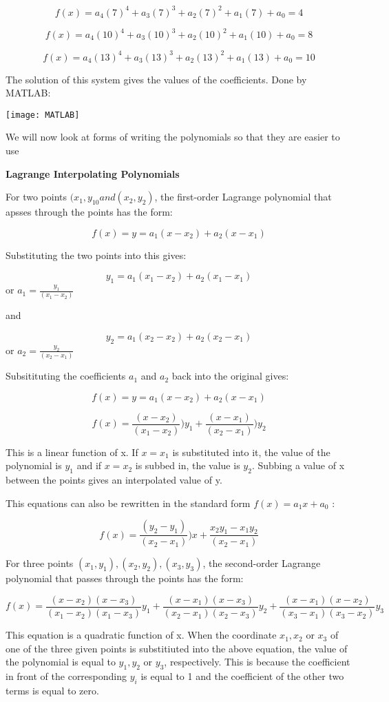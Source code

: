 \documentclass{article}
\begin{document}
\[f(x) = a_4(7)^4 + a_{3}(7)^{3} + a_2(7)^2 + a_1(7) + a_0 = 4\]

\[f(x) = a_4(10)^4 + a_{3}(10)^{3} + a_2(10)^2 + a_1(10) + a_0 = 8\]

\[f(x) = a_4(13)^4 + a_{3}(13)^{3} + a_2(13)^2 + a_1(13) + a_0 = 10\]

The solution of this system gives the values of the coefficients. Done by MATLAB:

\texttt{[image: MATLAB]}

We will now look at forms of writing the polynomials so that they are easier to use


\textbf{Lagrange Interpolating Polynomials}

For two points $(x_1, y_10 and (x_2, y_2)$, the first-order Lagrange polynomial that apsses through the points has the form:

\[f(x) = y = a_1(x - x_2) + a_2(x - x_1)\]

Substituting the two points into this gives:

\[y_1 = a_1(x_1 - x_2) + a_2(x_1 - x_1)\]   or $a_1 = \frac{y_1}{(x_1 - x_2)}$

and

\[y_2 = a_1(x_2 - x_2) + a_2(x_2 - x_1)\]    or $a_2 = \frac{y_2}{(x_2 - x_1)}$

Subsitituting the coefficients $a_1$ and $a_2$ back into the original gives:

\[f(x) = y = a_1(x - x_2) + a_2(x - x_1)\]

\[f(x) =\frac{(x - x_2)}{(x_1 - x_2)})y_1 + \frac{(x - x_1)}{(x_2 - x_1)})y_2\]

This is a linear function of x. If $x =  x_1$ is substituted into it, the value of the polynomial is $y_1$ and if $x = x_2$ is subbed in, the value is $y_2$. Subbing a value of x between the points gives an interpolated value of y.

This equations can also be rewritten in the standard form $f(x) = a_1x + a_0$ :

\[f(x) =\frac{(y_2 - y_1)}{(x_2 - x_1)})x + \frac{x_2y_1 - x_1y_2}{(x_2 - x_1)}\]


For three points $(x_1, y_1), (x_2, y_2), (x_3, y_3)$, the second-order Lagrange polynomial that passes through the points has the form:

\[f(x) = \frac{(x-x_2)(x-x_3)}{(x_1 - x_2)(x_1 - x_3)}y_1 +  \frac{(x-x_1)(x-x_3)}{(x_2 - x_1)(x_2 - x_3)}y_2 + \frac{(x-x_1)(x-x_2)}{(x_3 - x_1)(x_3 - x_2)}y_3\]

This equation is a quadratic function of x. When the coordinate $x_1, x_2$ or $x_3$ of one of the three given points is substitiuted into the above equation, the value of the polynomial is equal to $y_1, y_2$ or $y_3$, respectively. This is because the coefficient in front of the corresponding $y_i$ is equal to 1 and the coefficient of the other two terms is equal to zero.
\end{document}
